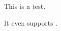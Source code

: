 \documentclass{article}
\begin{document}
This is a test.\normalcolor{}

It even supports .
\end{document}
